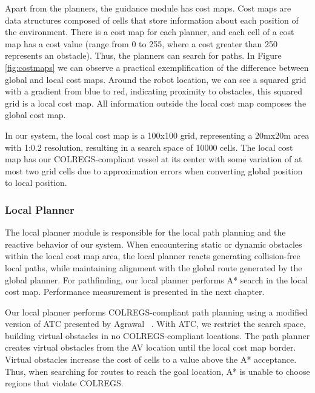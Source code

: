         Apart from the planners, the guidance module has cost maps. Cost maps are data structures composed of cells that store information about each position of the environment. There is a cost map for each planner, and each cell of a cost map has a cost value (range from 0 to 255, where a cost greater than 250 represents an obstacle). Thus, the planners can search for paths. In Figure \ref{fig:costmaps} we can observe a practical exemplification of the difference between global and local cost maps. Around the robot location, we can see a squared grid with a gradient from blue to red, indicating proximity to obstacles, this squared grid is a local cost map. All information outside the local cost map composes the global cost map.
        
        In our system, the local cost map is a 100x100 grid, representing a 20mx20m area with 1:0.2 resolution, resulting in a search space of 10000 cells. The local cost map has our \ac{COLREGS}-compliant vessel at its center with some variation of at most two grid cells due to approximation errors when converting global position to local position.

        \subsubsection{Local Planner}
        \label{sec:local_planner}
        
            The local planner module is responsible for the local path planning and the reactive behavior of our system. When encountering static or dynamic obstacles within the local cost map area, the local planner reacts generating collision-free local paths, while maintaining alignment with the global route generated by the global planner. For pathfinding, our local planner performs A* search in the local cost map. Performance measurement is presented in the next chapter.
            
            Our local planner performs \ac{COLREGS}-compliant path planning using a modified version of \ac{ATC} presented by Agrawal \etal~\cite{Agrawal2015COLREGS}. With \ac{ATC}, we restrict the search space, building virtual obstacles in no \ac{COLREGS}-compliant locations. The path planner creates virtual obstacles from the \ac{AV} location until the local cost map border. Virtual obstacles increase the cost of cells to a value above the A* acceptance. Thus, when searching for routes to reach the goal location, A* is unable to choose regions that violate \ac{COLREGS}.
            
